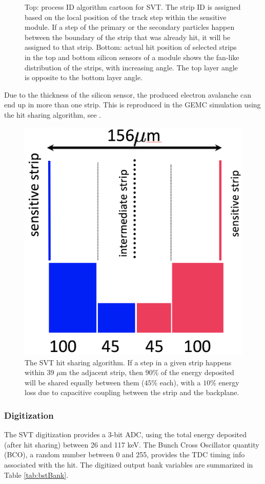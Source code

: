 \begin{figure}
	\caption{Top: process ID algorithm cartoon for SVT. The strip ID is assigned based on the local position of the track
            step within the sensitive module. If a step of the primary or the secondary particles happen between the boundary
            of the strip that was already hit, it will be assigned to that strip. Bottom: actual hit position of selected
            strips in the top and bottom silicon sensors of a module shows the fan-like distribution of the strips,
            with increasing angle. The top layer angle is opposite to the bottom layer angle. }
	\label{fig:processID}
\end{figure}

Due to the thickness of the silicon sensor, the produced electron avalanche can end up in more than one strip. This
is reproduced in the GEMC simulation using the hit sharing algorithm, see .

\begin{figure}[t]
	\centering
	\includegraphics[width=0.99\columnwidth, height=0.65\columnwidth]{img/bstHitSharing.png}
	\caption{The SVT hit sharing algorithm. If a step in a given strip happens within 39 $\mu$m the adjacent strip, then
             $90\%$ of the energy deposited will be shared equally between them ($45\%$ each), with a $10\%$ energy loss due
	         to capacitive coupling between the strip and the backplane.}
	\label{fig:bstHitSharing}
\end{figure}


\subsubsection{Digitization}

The SVT digitization provides a 3-bit ADC, using the total energy deposited (after hit sharing) between 26 and 117 keV.
The Bunch Cross Oscillator quantity (BCO), a random number between 0 and 255,
provides the TDC timing info associated with the hit.
The digitized output bank variables are summarized in Table \ref{tab:bstBank}.

